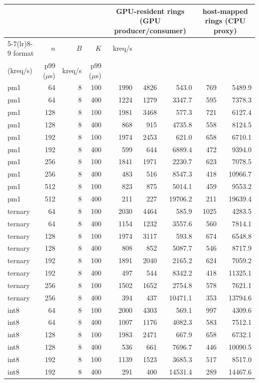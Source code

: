 \begin{tabular}{lrrrrrrrr}\toprule
 & & & & \multicolumn{3}{c}{GPU-resident rings (GPU producer/consumer)} & \multicolumn{2}{c}{host-mapped rings (CPU proxy)} \\
\cmidrule(lr){5-7}\cmidrule(lr){8-9}
format & $n$ & $B$ & $K$ & kreq/s & \shortstack{$N_w/t_{\mathrm{solve}}$\\(kreq/s)} & p99 ($\mu$s) & kreq/s & p99 ($\mu$s) \\ \midrule
pm1 & 64 & 8 & 100 & 1990 & 4826 & 543.0 & 769 & 5489.9 \\
pm1 & 64 & 8 & 400 & 1224 & 1279 & 3347.7 & 595 & 7378.3 \\
pm1 & 128 & 8 & 100 & 1981 & 3468 & 577.3 & 721 & 6127.4 \\
pm1 & 128 & 8 & 400 & 868 & 915 & 4735.8 & 558 & 8124.5 \\
pm1 & 192 & 8 & 100 & 1974 & 2453 & 621.0 & 658 & 6710.1 \\
pm1 & 192 & 8 & 400 & 599 & 644 & 6889.4 & 472 & 9394.0 \\
pm1 & 256 & 8 & 100 & 1841 & 1971 & 2230.7 & 623 & 7078.5 \\
pm1 & 256 & 8 & 400 & 483 & 516 & 8547.3 & 418 & 10966.7 \\
pm1 & 512 & 8 & 100 & 823 & 875 & 5014.1 & 459 & 9553.2 \\
pm1 & 512 & 8 & 400 & 211 & 227 & 19706.2 & 211 & 19639.4 \\
ternary & 64 & 8 & 100 & 2030 & 4464 & 585.9 & 1025 & 4283.5 \\
ternary & 64 & 8 & 400 & 1154 & 1232 & 3557.6 & 560 & 7814.1 \\
ternary & 128 & 8 & 100 & 1974 & 3117 & 593.8 & 674 & 6548.8 \\
ternary & 128 & 8 & 400 & 808 & 852 & 5087.7 & 546 & 8717.9 \\
ternary & 192 & 8 & 100 & 1891 & 2040 & 2165.2 & 624 & 7059.2 \\
ternary & 192 & 8 & 400 & 497 & 544 & 8342.2 & 418 & 11325.1 \\
ternary & 256 & 8 & 100 & 1502 & 1652 & 2754.8 & 578 & 7621.1 \\
ternary & 256 & 8 & 400 & 394 & 437 & 10471.1 & 353 & 13794.6 \\
int8 & 64 & 8 & 100 & 2000 & 4303 & 569.1 & 997 & 4309.6 \\
int8 & 64 & 8 & 400 & 1007 & 1176 & 4082.3 & 583 & 7512.1 \\
int8 & 128 & 8 & 100 & 1983 & 2471 & 667.9 & 658 & 6732.1 \\
int8 & 128 & 8 & 400 & 536 & 661 & 7696.7 & 446 & 10090.5 \\
int8 & 192 & 8 & 100 & 1139 & 1523 & 3685.3 & 517 & 8517.0 \\
int8 & 192 & 8 & 400 & 291 & 400 & 14531.4 & 289 & 14467.6 \\
\bottomrule\end{tabular}
